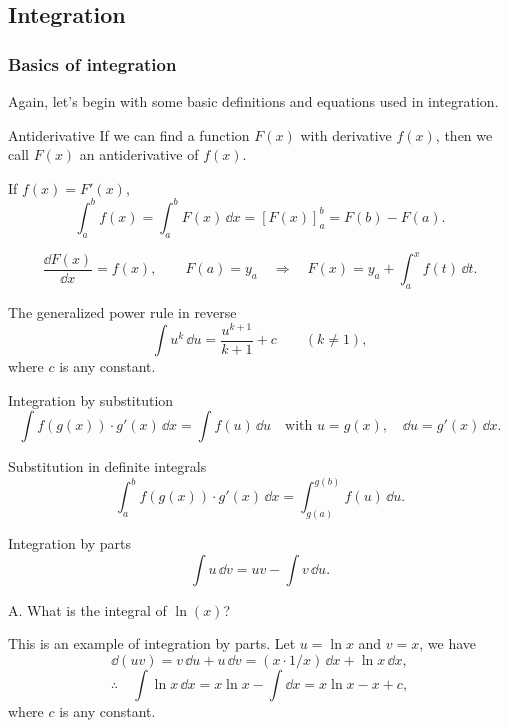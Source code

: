 \subsection{Integration}

\subsubsection*{Basics of integration}

Again, let's begin with some basic definitions and equations used in integration.

\begin{concept}{Antiderivative}
If we can find a function $F(x)$ with derivative $f(x)$, then we call $F(x)$ an
antiderivative of $f(x)$.

If $f(x)=F'(x)$,
\[
\int_a^b f(x)=\int_a^b F(x)\,\dd x=[F(x)]_a^b=F(b)-F(a).
\]

\[
\frac{\dd F(x)}{\dd x}=f(x),\qquad F(a)=y_a\quad\Rightarrow\quad
F(x)=y_a+\int_{a}^{x}f(t)\,\dd t.
\]
\end{concept}

\begin{concept}{The generalized power rule in reverse}
\[
\int u^k\,\dd u=\frac{u^{k+1}}{k+1}+c\qquad(k\ne1),
\]
where $c$ is any constant.
\end{concept}

\begin{concept}{Integration by substitution}
\[
\int f(g(x))\cdot g'(x)\,\dd x=\int f(u)\,\dd u
\quad\text{with }u=g(x),\quad \dd u=g'(x)\,\dd x.
\]
\end{concept}

\begin{concept}{Substitution in definite integrals}
\[
\int_a^b f(g(x))\cdot g'(x)\,\dd x
=\int_{g(a)}^{g(b)}f(u)\,\dd u.
\]
\end{concept}

\begin{concept}{Integration by parts}
\[
\int u\,\dd v=uv-\int v\,\dd u.
\]
\end{concept}

\begin{problem}{A. What is the integral of $\ln(x)$?}
\end{problem}

\begin{solution}

This is an example of integration by parts. Let $u=\ln x$ and $v=x$, we have
\[
\dd(uv)=v\,\dd u+u\,\dd v=(x\cdot1/x)\,\dd x+\ln x\,\dd x,
\]
\[
\therefore\quad\int\ln x\,\dd x=x\ln x-\int\dd x=x\ln x-x+c,
\]
where $c$ is any constant.

\end{solution}

